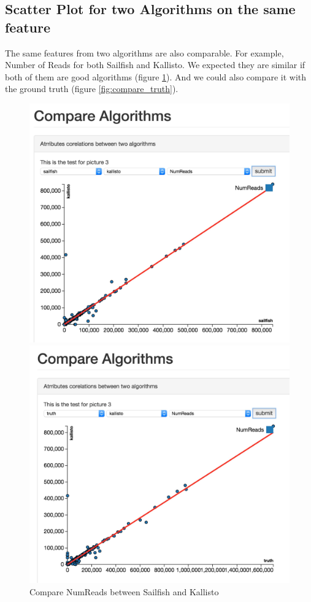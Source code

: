 \documentclass[11pt,letter]{article}
\begin{document}
\subsection {Scatter Plot for two Algorithms on the same feature}
The same features from two algorithms are also comparable. For example, Number of Reads for both Sailfish and Kallisto. We expected they are similar if both of them are good algorithms (figure \ref{fig:compare_sk}). And we could also compare it with the ground truth (figure \ref{fig:compare_truth}).

\begin{figure}[ht]
\centering
\begin{minipage}[b]{0.47\linewidth}
\includegraphics[width=1.0\textwidth]{./fig/compare_sk.jpg}
\caption{Compare NumReads between Sailfish and Kallisto }
\label{fig:compare_sk}
\end{minipage}
\quad
\begin{minipage}[b]{0.47\linewidth}
\includegraphics[width=1.0\textwidth]{./fig/compare_truth.jpg}

\end{minipage}
\end{figure}
\end{document}
